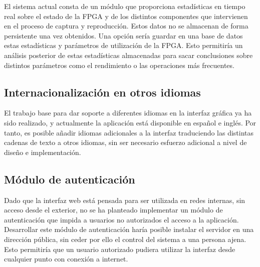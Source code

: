 El sistema actual consta de un módulo que proporciona estadísticas en tiempo real sobre el estado de la \gls{FPGA} y de los distintos componentes que intervienen en el proceso de captura y reproducción.
Estos datos no se almacenan de forma persistente una vez obtenidos.
Una opción sería guardar en una base de datos estas estadísticas y parámetros de utilización de la \gls{FPGA}.
Esto permitiría un análisis posterior de estas estadísticas almacenadas para sacar conclusiones sobre distintos parámetros como el rendimiento o las operaciones más frecuentes.


\subsection*{Internacionalización en otros idiomas}

El trabajo base para dar soporte a diferentes idiomas en la interfaz gráfica ya ha sido realizado, y actualmente la aplicación está disponible en español e inglés.
Por tanto, es posible añadir idiomas adicionales a la interfaz traduciendo las distintas cadenas de texto a otros idiomas, sin ser necesario esfuerzo adicional a nivel de diseño e implementación.


\subsection*{Módulo de autenticación}

Dado que la interfaz web está pensada para ser utilizada en redes internas, sin acceso desde el exterior, no se ha planteado implementar un módulo de autenticación que impida a usuarios no autorizados el acceso a la aplicación.
Desarrollar este módulo de autenticación haría posible instalar el servidor en una dirección pública, sin ceder por ello el control del sistema a una persona ajena.
Esto permitiría que un usuario autorizado pudiera utilizar la interfaz desde cualquier punto con conexión a internet.
